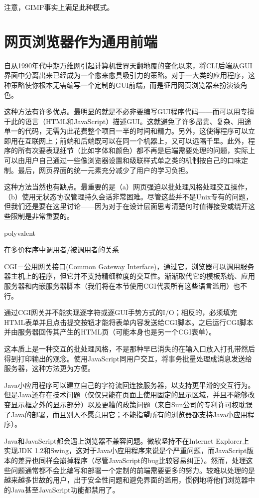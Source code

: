 \documentclass[12pt,oneside]{ctexbook}
\begin{document}
\begin{common-format}
注意，GIMP事实上满足此种模式。

\section{网页浏览器作为通用前端}
自从1990年代中期万维网引起计算机世界天翻地覆的变化以来，将CLI后端从GUI界面中分离出来已经成为一个愈来愈具吸引力的策略。对于一大类的应用程序，这种策略使你根本无需编写一个定制的GUI前端，而是征用网页浏览器来扮演该角色。

这种方法有许多优点。最明显的就是不必非要编写GUI程序代码——而可以用专擅于此的语言（HTML和JavaScript）描述GUI。这就避免了许多昂贵、复杂、用途单一的代码，无需为此花费整个项目一半的时间和精力。另外，这使得程序可以立即用在互联网上；前端和后端既可以在同一个机器上，又可以远隔千里。此外，程序的所有次要表现细节（比如字体和颜色）都不再是后端需要处理的问题，实际上可以由用户自己通过一些像浏览器设置和级联样式单之类的机制按自己的口味定制。最后，网页界面的统一元素充分减少了用户的学习负担。

这种方法当然也有缺点。最重要的是（a）网页强迫以批处理风格处理交互操作，（b）使用无状态协议管理持久会话非常困难。尽管这些并不是Unix专有的问题，但我们还是要在这里讨论——因为对于在设计层面思考清楚何时值得接受或绕开这些限制是非常重要的。

\begin{fig}{polyvalent}
\caption{在多价程序中调用者/被调用者的关系}
\label{fig:polyvalent}
\end{fig}

CGI－公用网关接口(Common Gateway Interface)，通过它，浏览器可以调用服务器主机上的程序，但它并不支持精细粒度的交互性。渐渐取代它的模板系统、应用服务器和内嵌服务器脚本（我们将在本节使用CGI代表所有这些语言滥用）也不行。

通过CGI网关并不能实现逐字符或逐GUI手势方式的I/O；相反的，必须填完HTML表单并且点击提交按钮才能将表单内容发送给CGI脚本。之后运行CGI脚本并由服务器回传其产生的HTML页（可能本身也是另一个CGI表单）。

这本质上是一种交互的批处理风格，不是那种早已消失的在输入口放入打孔带然后得到打印输出的观念。使用JavaScript同用户交互，将事务批量处理成消息发送给服务器，这种方法更为方便。

Java小应用程序可以建立自己的字符流回连接服务器，以支持更平滑的交互行为。但是Java还存在技术问题（仅仅只能在页面上使用固定的显示区域，并且不能够改变显示框之外的显示部分）以及更糟的政策问题（来自Sun公司的专利许可权耽误了Java的部署，而且别人不愿意用它；不能指望所有的浏览器都支持Java小应用程序）。

Java和JavaScript都会遇上浏览器不兼容问题。微软坚持不在Internet Explorer上实现JDK 1.2和Swing，这对于Java小应用程序来说是个严重问题，而JavaScript版本的差异也同样会崩掉程序（尽管JavaScript的bug比较容易纠正）。然而，处理这些问题通常都不会比编写和部署一个定制的前端需要更多的努力。较难以处理的是越来越多世故的用户，出于安全性问题和避免界面的滥用，惯例地将他们浏览器中的Java甚至JavaScript功能都禁用了。


\end{common-format}
\end{document}
